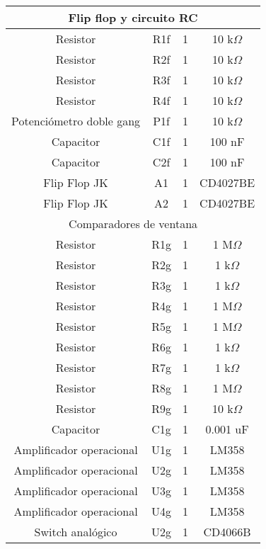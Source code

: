 \begin{longtable}{cccc}
\midrule
\multicolumn{4}{c}{Flip flop y circuito RC} \\ 
\midrule
Resistor & R1f & 1 & 10 k$\Omega$ \\  
Resistor & R2f & 1 & 10 k$\Omega$ \\ 
Resistor & R3f & 1 & 10 k$\Omega$ \\  
Resistor & R4f & 1 & 10 k$\Omega$ \\ 
Potenci\'ometro doble gang & P1f & 1 & 10 k$\Omega$ \\  
Capacitor & C1f & 1 & 100 nF \\  
Capacitor & C2f & 1 & 100 nF \\  
Flip Flop JK & A1 & 1 & CD4027BE \\
Flip Flop JK & A2 & 1 & CD4027BE \\

\midrule
\multicolumn{4}{c}{Comparadores de ventana} \\ 
\midrule
Resistor & R1g & 1 & 1  M$\Omega$ \\  
Resistor & R2g & 1 & 1  k$\Omega$ \\  
Resistor & R3g & 1 & 1  k$\Omega$ \\  
Resistor & R4g & 1 & 1  M$\Omega$ \\  
Resistor & R5g & 1 & 1  M$\Omega$ \\  
Resistor & R6g & 1 & 1  k$\Omega$ \\  
Resistor & R7g & 1 & 1  k$\Omega$ \\  
Resistor & R8g & 1 & 1  M$\Omega$ \\  
Resistor & R9g & 1 & 10 k$\Omega$ \\
Capacitor & C1g & 1 & 0.001 uF \\
Amplificador operacional & U1g & 1 & LM358 \\
Amplificador operacional & U2g & 1 & LM358 \\
Amplificador operacional & U3g & 1 & LM358 \\
Amplificador operacional & U4g & 1 & LM358 \\  
Switch anal\'ogico & U2g & 1 & CD4066B \\  


\end{longtable}
